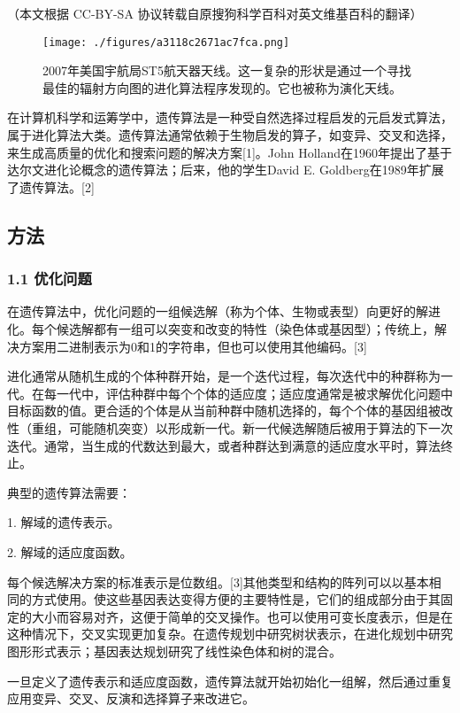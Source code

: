 
（本文根据 CC-BY-SA 协议转载自原搜狗科学百科对英文维基百科的翻译）

\begin{figure}[ht]
\centering
\texttt{[image: ./figures/a3118c2671ac7fca.png]}
\caption{2007年美国宇航局ST5航天器天线。这一复杂的形状是通过一个寻找最佳的辐射方向图的进化算法程序发现的。它也被称为演化天线。} \label{fig_YCSF_1}
\end{figure}
在计算机科学和运筹学中，遗传算法是一种受自然选择过程启发的元启发式算法，属于进化算法大类。遗传算法通常依赖于生物启发的算子，如变异、交叉和选择，来生成高质量的优化和搜索问题的解决方案[1]。John Holland在1960年提出了基于达尔文进化论概念的遗传算法；后来，他的学生David E. Goldberg在1989年扩展了遗传算法。[2]

\subsection{方法}
\subsubsection{1.1 优化问题}
在遗传算法中，优化问题的一组候选解（称为个体、生物或表型）向更好的解进化。每个候选解都有一组可以突变和改变的特性（染色体或基因型）；传统上，解决方案用二进制表示为0和1的字符串，但也可以使用其他编码。[3]

进化通常从随机生成的个体种群开始，是一个迭代过程，每次迭代中的种群称为一代。在每一代中，评估种群中每个个体的适应度；适应度通常是被求解优化问题中目标函数的值。更合适的个体是从当前种群中随机选择的，每个个体的基因组被改性（重组，可能随机突变）以形成新一代。新一代候选解随后被用于算法的下一次迭代。通常，当生成的代数达到最大，或者种群达到满意的适应度水平时，算法终止。

典型的遗传算法需要：

1.    解域的遗传表示。

2.    解域的适应度函数。

每个候选解决方案的标准表示是位数组。[3]其他类型和结构的阵列可以以基本相同的方式使用。使这些基因表达变得方便的主要特性是，它们的组成部分由于其固定的大小而容易对齐，这便于简单的交叉操作。也可以使用可变长度表示，但是在这种情况下，交叉实现更加复杂。在遗传规划中研究树状表示，在进化规划中研究图形形式表示；基因表达规划研究了线性染色体和树的混合。

一旦定义了遗传表示和适应度函数，遗传算法就开始初始化一组解，然后通过重复应用变异、交叉、反演和选择算子来改进它。

